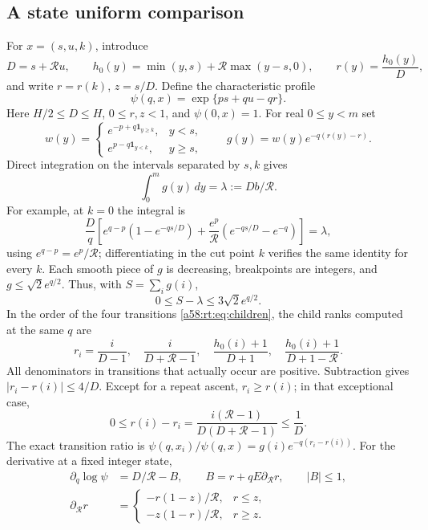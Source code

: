 \documentclass[11pt,letterpaper]{article}
\theoremstyle{remark}
\newcommand{\one}{\mathbf 1}
\newcommand{\dd}{\,d}
\begin{document}
\subsection{A state uniform comparison}
For $x=(s,u,k)$, introduce
\[
 D=s+\mathcal R u,\qquad
 h_0(y)=\min(y,s)+\mathcal R\max(y-s,0),\qquad
 r(y)=\frac{h_0(y)}D,
\]
and write $r=r(k)$, $z=s/D$. Define the characteristic profile
\begin{equation}\label{a58:rt:eq:psi}
 \psi(q,x)=\exp\{ps+qu-qr\}.
\end{equation}
Here $H/2\le D\le H$, $0\le r,z<1$, and $\psi(0,x)=1$.
For real $0\le y<m$ set
\[
 w(y)=\begin{cases}e^{-p+q\one_{y\ge k}},&y<s,\\
 e^{p-q\one_{y<k}},&y\ge s,
 \end{cases}
 \qquad g(y)=w(y)e^{-q(r(y)-r)}.
\]
Direct integration on the intervals separated by $s,k$ gives
\begin{equation}\label{a58:rt:eq:frozen}
 \int_0^m g(y)\dd y=\lambda:=Db/\mathcal R.
\end{equation}
For example, at $k=0$ the integral is
\[
 \frac Dq\left[e^{q-p}(1-e^{-qs/D})
 +\frac{e^p}{\mathcal R}(e^{-qs/D}-e^{-q})\right]=\lambda,
\]
using $e^{q-p}=e^p/\mathcal R$; differentiating in the cut point $k$
verifies the same identity for every $k$. Each smooth piece of $g$ is
decreasing, breakpoints are integers, and $g\le\sqrt2 e^{q/2}$.
Thus, with $S=\sum_i g(i)$,
\begin{equation}\label{a58:rt:eq:riemann}
 0\le S-\lambda\le3\sqrt2e^{q/2}.
\end{equation}
In the order of the four transitions \eqref{a58:rt:eq:children}, the child ranks
computed at the same $q$ are
\[
 r_i=\frac{i}{D-1},\quad \frac{i}{D+\mathcal R-1},\quad
 \frac{h_0(i)+1}{D+1},\quad
 \frac{h_0(i)+1}{D+1-\mathcal R}.
\]
All denominators in transitions that actually occur are positive.
Subtraction gives $|r_i-r(i)|\le4/D$. Except for a repeat ascent,
$r_i\ge r(i)$; in that exceptional case,
\[
 0\le r(i)-r_i
 =\frac{i(\mathcal R-1)}{D(D+\mathcal R-1)}\le\frac1D.
\]
The exact transition ratio is
$\psi(q,x_i)/\psi(q,x)=g(i)e^{-q(r_i-r(i))}$.
For the derivative at a fixed integer state,
\begin{align*}
 \partial_q\log\psi&=D/\mathcal R-B,\qquad
 B=r+qE\partial_{\mathcal R}r,\qquad |B|\le1,\\
 \partial_{\mathcal R}r&=
 \begin{cases}-r(1-z)/\mathcal R,&r\le z,\\
 -z(1-r)/\mathcal R,&r\ge z.
 \end{cases}
\end{align*}
\end{document}
